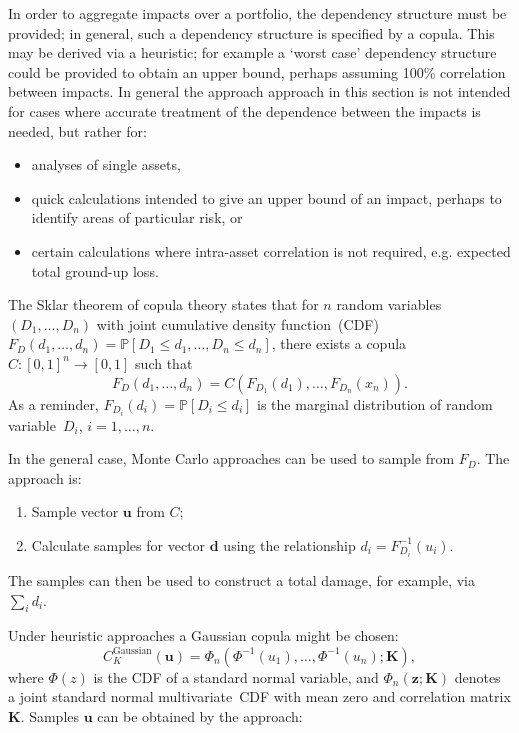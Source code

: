 \documentclass[a4paper,11pt]{extarticle} %
\begin{document}
 In order to aggregate impacts over a portfolio, the dependency structure must be provided; in general, such a dependency structure is specified by a copula\cite{Nelsen:2007}. This may be derived via a heuristic; for example a `worst case' dependency structure could be provided to obtain an upper bound, perhaps assuming 100\% correlation between impacts. In general the approach approach in this section is not intended for cases where accurate treatment of the dependence between the impacts is needed, but rather for:

\begin{itemize}
\item analyses of single assets,
\item quick calculations intended to give an upper bound of an impact, perhaps to identify areas of particular risk, or
\item certain calculations where intra-asset correlation is not required, e.g. expected total ground-up loss.
\end{itemize}

The Sklar theorem of copula theory states that for $n$ random variables~$(D_1, \dots, D_n)$ with joint cumulative density function~(CDF)~$F_D(d_1, \dots, d_n) = \mathbb{P}[D_1 \le d_1, \dots, D_n \le d_n]$, there exists a copula~\mbox{$C:[0,1]^n \rightarrow [0,1]$} such that
\begin{equation}
    \label{Eq:Copula}
    F_D(d_1, \dots, d_n) = C \left( F_{D_1}(d_1), \dots, F_{D_n}(x_n) \right).
\end{equation}
As a reminder, $F_{D_i}(d_i) = \mathbb{P}[D_i \le d_i]$ is the marginal distribution of random variable~$D_i$, \mbox{$i=1, \dots, n$}.

In the general case, Monte Carlo approaches can be used to sample from $F_D$. The approach is:

\begin{enumerate}[]
    \item Sample vector $\mathbf{u}$ from $C$;
    \item Calculate samples for vector $\mathbf{d}$ using the relationship $d_i = F_{D_i}^{-1}(u_i)$.
\end{enumerate}

The samples can then be used to construct a total damage, for example, via $\sum_i d_i$.

Under heuristic approaches a Gaussian copula might be chosen:
\begin{equation}
    \label{Eq:CopulaGaussian}
    C^{\text{Gaussian}}_K(\mathbf{u}) = \Phi_n(\Phi^{-1}(u_1), \dots, \Phi^{-1}(u_n);\mathbf{K}),
\end{equation}
where $\Phi(z)$ is the CDF of a standard normal variable, and $\Phi_n(\mathbf{z}; \mathbf{K})$ denotes a joint standard normal multivariate~CDF with mean zero and correlation matrix $\mathbf{K}$. Samples $\mathbf{u}$ can be obtained by the approach:
\end{document}
